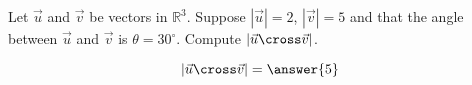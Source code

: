 \documentclass{ximera}
\author{Gregory Hartman \and Matthew Carr}
\begin{document}
\begin{exercise}

Let $\vec{u}$ and $\vec{v}$ be vectors in $\mathbb{R}^3$. Suppose $|\vec{u}|=2$, $|\vec{v}|=5$ and that the angle between $\vec{u}$ and $\vec{v}$ is $\theta=30^{\circ}$. Compute $|\vec{u}\cross\vec{v}|$.

\begin{prompt}
\[
|\vec{u}\cross\vec{v}|=\answer{5}
\]
\end{prompt}


\end{exercise}
\end{document}
